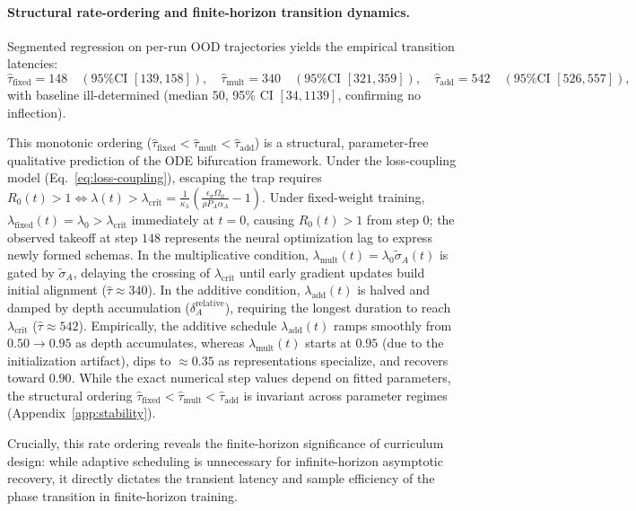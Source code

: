 \documentclass{article}
\theoremstyle{definition}
\begin{document}
\paragraph*{Structural rate-ordering and finite-horizon transition dynamics.}
Segmented regression on per-run OOD trajectories yields the empirical transition latencies:
\begin{equation}
\hat{\tau}_{\text{fixed}} = 148 \quad (\text{95\% CI } [139, 158]), \quad
\hat{\tau}_{\text{mult}} = 340 \quad (\text{95\% CI } [321, 359]), \quad
\hat{\tau}_{\text{add}} = 542 \quad (\text{95\% CI } [526, 557]),
\end{equation}
with baseline ill-determined (median $50$, 95\% CI $[34, 1139]$, confirming no inflection).

This monotonic ordering ($\hat{\tau}_{\text{fixed}} < \hat{\tau}_{\text{mult}} < \hat{\tau}_{\text{add}}$) is a structural, parameter-free qualitative prediction of the ODE bifurcation framework. Under the loss-coupling model (Eq.~\eqref{eq:loss-coupling}), escaping the trap requires $R_0(t) > 1 \iff \lambda(t) > \lambda_{\text{crit}} = \frac{1}{\kappa_\lambda} \left( \frac{\epsilon_\sigma \Omega_0}{\rho P_A \alpha_A} - 1 \right)$. 
Under fixed-weight training, $\lambda_{\text{fixed}}(t) = \lambda_0 > \lambda_{\text{crit}}$ immediately at $t=0$, causing $R_0(t) > 1$ from step 0; the observed takeoff at step $148$ represents the neural optimization lag to express newly formed schemas. In the multiplicative condition, $\lambda_{\text{mult}}(t) = \lambda_0 \tilde{\sigma}_A(t)$ is gated by $\tilde{\sigma}_A$, delaying the crossing of $\lambda_{\text{crit}}$ until early gradient updates build initial alignment ($\hat{\tau} \approx 340$). In the additive condition, $\lambda_{\text{add}}(t)$ is halved and damped by depth accumulation ($\delta_A^{\text{relative}}$), requiring the longest duration to reach $\lambda_{\text{crit}}$ ($\hat{\tau} \approx 542$). Empirically, the additive schedule $\lambda_{\text{add}}(t)$ ramps smoothly from $0.50 \to 0.95$ as depth accumulates, whereas $\lambda_{\text{mult}}(t)$ starts at $0.95$ (due to the initialization artifact), dips to $\approx 0.35$ as representations specialize, and recovers toward $0.90$. While the exact numerical step values depend on fitted parameters, the structural ordering $\hat{\tau}_{\text{fixed}} < \hat{\tau}_{\text{mult}} < \hat{\tau}_{\text{add}}$ is invariant across parameter regimes (Appendix~\ref{app:stability}).

Crucially, this rate ordering reveals the finite-horizon significance of curriculum design: while adaptive scheduling is unnecessary for infinite-horizon asymptotic recovery, it directly dictates the transient latency and sample efficiency of the phase transition in finite-horizon training.
\end{document}
